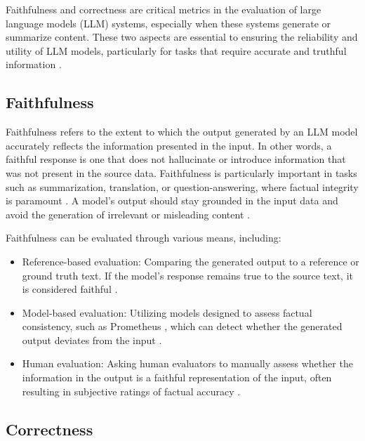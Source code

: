 Faithfulness and correctness are critical metrics in the evaluation of large language models (LLM) systems, especially when these systems generate or summarize content. These two aspects are essential to ensuring the reliability and utility of LLM models, particularly for tasks that require accurate and truthful information \cite{lyu2024faithfulmodelexplanationnlp}.

\subsection{Faithfulness}

Faithfulness refers to the extent to which the output generated by an LLM model accurately reflects the information presented in the input. In other words, a faithful response is one that does not hallucinate or introduce information that was not present in the source data. Faithfulness is particularly important in tasks such as summarization, translation, or question-answering, where factual integrity is paramount \cite{madsen-etal-2022-evaluating}. A model's output should stay grounded in the input data and avoid the generation of irrelevant or misleading content \cite{yin2022sensitivitystabilitymodelinterpretations}.

Faithfulness can be evaluated through various means, including: \begin{itemize} \item Reference-based evaluation: Comparing the generated output to a reference or ground truth text. If the model's response remains true to the source text, it is considered faithful \cite{parcalabescu2024measuringfaithfulnessselfconsistencynatural}. \item Model-based evaluation: Utilizing models designed to assess factual consistency, such as Prometheus \cite{kim2024prometheus2opensource}, which can detect whether the generated output deviates from the input \cite{gat2023faithfulexplanationsblackboxnlp}. \item Human evaluation: Asking human evaluators to manually assess whether the information in the output is a faithful representation of the input, often resulting in subjective ratings of factual accuracy \cite{jacovi-goldberg-2020-towards}. \end{itemize}

\subsection{Correctness}

